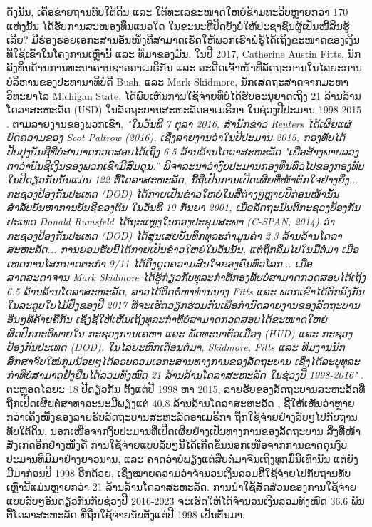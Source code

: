\documentclass[10pt,twocolumn,letterpaper]{article}
\begin{document}
ດັ່ງນັ້ນ, ເຄືອຂ່າຍຖານທັບໃຕ້ດິນ ແລະ ໃຕ້ທະເລຂະໜາດໃຫຍ່ຂ້າມທະວີບຫຼາຍກວ່າ 170 ແຫ່ງນັ້ນ ໄດ້ຮັບການສະໜອງທຶນແນວໃດ ໃນຂະນະທີ່ປິດບັງບໍ່ໃຫ້ປະຊາຊົນຜູ້ເປັນໜີ້ສິນຮູ້ເລີຍ? 
ມີຮ່ອງຮອຍເອກະສານອັນໜຶ່ງທີ່ສາມາດເຮັດໃຫ້ພວກເຮົາພໍຮູ້ໄດ້ເຖິງຂະໜາດຂອງເງິນທີ່ໃຊ້ເຂົ້າໃນໂຄງການເຫຼົ່ານີ້ ແລະ ທີ່ມາຂອງມັນ. 
ໃນປີ 2017, Catherine Austin Fitts, ນັກລົງທຶນດ້ານການທະນາຄານຊາວອາເມຣິກັນ ແລະ ອະດີດເຈົ້າໜ້າທີ່ລັດຖະການໃນໄລຍະການບໍລິຫານຂອງປະທານາທິບໍດີ Bush, ແລະ Mark Skidmore, ນັກເສດຖະສາດຈາກມະຫາວິທະຍາໄລ Michigan State, ໄດ້ພົບເຫັນການໃຊ້ຈ່າຍທີ່ບໍ່ໄດ້ຮັບອະນຸຍາດເຖິງ 21 ລ້ານລ້ານໂດລາສະຫະລັດ (USD) ໃນລັດຖະບານສະຫະລັດອາເມຣິກາ ໃນຊ່ວງປີປະມານ 1998-2015 \cite{11,12,13}.
ຕາມລາຍງານຂອງພວກເຂົາ, \textit{"ໃນວັນທີ 7 ຕຸລາ 2016, ສຳນັກຂ່າວ Reuters ໄດ້ເຜີຍແຜ່ບົດຄວາມຂອງ Scot Paltrow (2016), ເຊິ່ງລາຍງານວ່າໃນປີປະມານ 2015, ກອງທັບໄດ້ປັບປຸງບັນຊີທີ່ບໍ່ສາມາດກວດສອບໄດ້ເຖິງ 6.5 ລ້ານລ້ານໂດລາສະຫະລັດ "ເພື່ອສ້າງພາບລວງຕາວ່າບັນຊີເງີນຂອງພວກເຂົາມີສົມດຸນ.” 
ພິຈາລະນາວ່າງົບປະມານກອງທຶນທົ່ວໄປຂອງກອງທັບໃນປີດຽວກັນນັ້ນແມ່ນ 122 ຕື້ໂດລາສະຫະລັດ, ນີ້ຖືເປັນການເປີດເຜີຍທີ່ໜ້າຕົກໃຈຢ່າງຍິ່ງ... ກະຊວງປ້ອງກັນປະເທດ (DOD) ໄດ້ກາຍເປັນຂ່າວໃຫຍ່ໃນສື່ຕ່າງໆຫຼາຍປີກ່ອນໜ້ານັ້ນ ສຳລັບບັນຫາການບັນຊີຂອງຕົນ ໃນວັນທີ 10 ກັນຍາ 2001, ເມື່ອລັດຖະມົນຕີກະຊວງປ້ອງກັນປະເທດ Donald Rumsfeld ໄດ້ຖະແຫຼງໃນກອງປະຊຸມສະພາ (C-SPAN, 2014) ວ່າ ກະຊວງປ້ອງກັນປະເທດ (DOD) ໄດ້ສູນເສຍບັນທຶກທຸລະກຳມູນຄ່າ 2.3 ລ້ານລ້ານໂດລາສະຫະລັດ... ການຍອມຮັບນີ້ໄດ້ກາຍເປັນຂ່າວໃຫຍ່ໃນວັນນັ້ນ, ແຕ່ຖືກລືມໄປໃນມື້ຕໍ່ມາ ເມື່ອເຫດການໂສກນາດຕະກໍາ 9/11 ໄດ້ດຶງດູດຄວາມສົນໃຈຂອງຄົນທົ່ວໂລກ... ເມື່ອສາດສະດາຈານ Mark Skidmore ໄດ້ຮູ້ກ່ຽວກັບທຸລະກໍາທີ່ກອງທັບບໍ່ສາມາດກວດສອບໄດ້ເຖິງ 6.5 ລ້ານລ້ານໂດລາສະຫະລັດ, ລາວໄດ້ຕິດຕໍ່ຫາທ່ານນາງ Fitts ແລະ ພວກເຂົາໄດ້ຕົກລົງກັນໃນລະດູບໃບໄມ້ປົ່ງຂອງປີ 2017 ທີ່ຈະເຮັດວຽກຮ່ວມກັນເພື່ອກໍານົດລາຍງານຂອງລັດຖະບານອື່ນໆທີ່ຄ້າຍຄືກັນ ເຊິ່ງຊີ້ໃຫ້ເຫັນເຖິງທຸລະກໍາທີ່ບໍ່ສາມາດກວດສອບໄດ້ຂະໜາດໃຫຍ່ຜິດປົກກະຕິພາຍໃນ ກະຊວງການເຄຫາ ແລະ ພັດທະນາຕົວເມືອງ (HUD) ແລະ ກະຊວງປ້ອງກັນປະເທດ (DOD). ໃນໄລຍະຫົກເດືອນຕໍ່ມາ, Skidmore, Fitts ແລະ ທີມງານນັກສຶກສາຈົບໃໝ່ກຸ່ມນ້ອຍໆໄດ້ລວບລວມເອກະສານທາງການຂອງລັດຖະບານ ເຊິ່ງໄດ້ລະບຸທຸລະກຳທີ່ບໍ່ສາມາດຢັ້ງຢືນໄດ້ລວມທັງໝົດ 21 ລ້ານລ້ານໂດລາສະຫະລັດ ໃນຊ່ວງປີ 1998-2016"} \cite{12}. 
ຕະຫຼອດໄລຍະ 18 ປີດຽວກັນ ຕັ້ງແຕ່ປີ 1998 ຫາ 2015, ລາຍຮັບຂອງລັດຖະບານສະຫະລັດທີ່ຖືກເປີດເຜີຍຕໍ່ສາທາລະນະມີພຽງແຕ່ 40.8 ລ້ານລ້ານໂດລາສະຫະລັດ \cite{15}, ຊີ້ໃຫ້ເຫັນວ່າຫຼາຍກວ່າເຄິ່ງໜຶ່ງຂອງລາຍຮັບລັດຖະບານສະຫະລັດອາເມຣິກາ ຖືກໃຊ້ຈ່າຍຢ່າງລັບໆໄປກັບຖານທັບໃຕ້ດິນ, ນອກເໜືອຈາກງົບປະມານທີ່ເປີດເຜີຍຢ່າງເປັນທາງການຂອງລັດຖະບານ
ສິ່ງທີ່ໜ້າສັງເກດອີກຢ່າງໜຶ່ງຄື ການໃຊ້ຈ່າຍແບບລັບໆນີ້ໄດ້ເກີດຂຶ້ນນອກເໜືອຈາກການຂາດດຸນງົບປະມານທີ່ມີມາຢ່າງຍາວນານ, ແລະ ຄາດວ່າບໍ່ພຽງແຕ່ສືບຕໍ່ມາຈົນເຖິງທຸກມື້ນີ້ເທົ່ານັ້ນ ແຕ່ຍັງມີມາກ່ອນປີ 1998 ອີກດ້ວຍ, ເຊິ່ງໝາຍຄວາມວ່າຈຳນວນເງິນລວມທີ່ໃຊ້ຈ່າຍໄປກັບຖານທັບເຫຼົ່ານີ້ແມ່ນຫຼາຍກວ່າ 21 ລ້ານລ້ານໂດລາສະຫະລັດ. 
ການນຳໃຊ້ສັດສ່ວນຂອງການໃຊ້ຈ່າຍແບບລັບໆອັນດຽວກັນກັບຊ່ວງປີ 2016-2023 ຈະເຮັດໃຫ້ໄດ້ຈຳນວນເງິນລວມທັງໝົດ 36.6 ພັນຕື້ໂດລາສະຫະລັດ ທີ່ຖືກໃຊ້ຈ່າຍນັບຕັ້ງແຕ່ປີ 1998 ເປັນຕົ້ນມາ.
\end{document}
